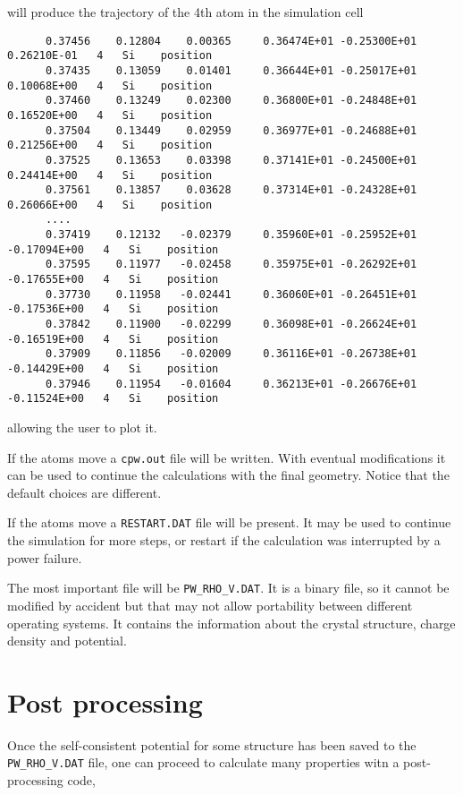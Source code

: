 \documentclass[11pt]{article}
\begin{document}
will produce the trajectory of the 4th atom in the simulation cell
\begin{verbatim}
      0.37456    0.12804    0.00365     0.36474E+01 -0.25300E+01  0.26210E-01   4   Si    position
      0.37435    0.13059    0.01401     0.36644E+01 -0.25017E+01  0.10068E+00   4   Si    position
      0.37460    0.13249    0.02300     0.36800E+01 -0.24848E+01  0.16520E+00   4   Si    position
      0.37504    0.13449    0.02959     0.36977E+01 -0.24688E+01  0.21256E+00   4   Si    position
      0.37525    0.13653    0.03398     0.37141E+01 -0.24500E+01  0.24414E+00   4   Si    position
      0.37561    0.13857    0.03628     0.37314E+01 -0.24328E+01  0.26066E+00   4   Si    position
      ....
      0.37419    0.12132   -0.02379     0.35960E+01 -0.25952E+01 -0.17094E+00   4   Si    position
      0.37595    0.11977   -0.02458     0.35975E+01 -0.26292E+01 -0.17655E+00   4   Si    position
      0.37730    0.11958   -0.02441     0.36060E+01 -0.26451E+01 -0.17536E+00   4   Si    position
      0.37842    0.11900   -0.02299     0.36098E+01 -0.26624E+01 -0.16519E+00   4   Si    position
      0.37909    0.11856   -0.02009     0.36116E+01 -0.26738E+01 -0.14429E+00   4   Si    position
      0.37946    0.11954   -0.01604     0.36213E+01 -0.26676E+01 -0.11524E+00   4   Si    position
\end{verbatim}
allowing the user to plot it.

If the atoms move a {\tt cpw.out} file will be written.  With eventual modifications it can be used
to continue the calculations with the final geometry.  Notice that the default choices are different.

If the atoms move a {\tt RESTART.DAT} file will be present.  It may be used to continue the
simulation for more steps, or restart if the calculation was interrupted by a power failure.

The most important file will be {\tt PW\_RHO\_V.DAT}.  It is a binary file, so it cannot be modified by accident
but that may not allow portability between different operating systems.
It contains the information about the crystal structure, charge density and potential.


\section{Post processing}

Once the self-consistent potential for some structure has been saved to the {\tt PW\_RHO\_V.DAT} file,
one can proceed to calculate many properties witn a post-processing code,
\end{document}
